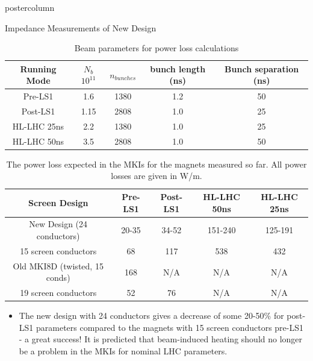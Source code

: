 \documentclass[final,hyperref={pdfpagelabels=false}]{beamer}
\begin{document}
\begin{frame}
\begin{columns}
\begin{column}{.49\textwidth}
\begin{beamercolorbox}[center,wd=\textwidth]{postercolumn}
\begin{minipage}[T]{.95\textwidth}
{\begin{block}{Impedance Measurements of New Design}
\begin{table}
\label{tab:beamPar}
\caption*{Beam parameters for power loss calculations}
\begin{center}
\begin{tabular}{c | c | c | c | c}
\small{Running Mode} & $N_{b}$ $10^{11}$ & $n_{bunches}$ & bunch length (ns) & Bunch separation (ns) \\ \hline 
\small{Pre-LS1} & 1.6 & 1380 & 1.2 & 50 \\ \hline
\small{Post-LS1} & 1.15 & 2808 & 1.0 & 25 \\ \hline
\small{HL-LHC 25ns}& 2.2 & 1380 & 1.0 & 25 \\ \hline
\small{HL-LHC 50ns}& 3.5 & 2808 & 1.0 & 50 \\
\end{tabular}
\end{center}
\end{table}

\begin{table}
\label{tab:heating-mki-screen-designs}
\caption*{\small{The power loss expected  in the MKIs for the magnets measured so far. All power losses are given in W/m.}}
\begin{center}
\begin{tabular}{c | c | c | c | c}
\small{Screen Design} & \small{Pre-LS1} & \small{Post-LS1} & \small{HL-LHC 50ns} & \small{HL-LHC 25ns} \\ \hline 
\small{New Design (24 conductors)} & 20-35 & 34-52 & 151-240 & 125-191 \\ \hline
\small{15 screen conductors} & 68 & 117 & 538 & 432 \\ \hline
\small{Old MKI8D (twisted, 15 conds)} & 168 & N/A & N/A & N/A \\ \hline
\small{19 screen conductors} & 52 & 76 & N/A & N/A \\
\end{tabular}
\end{center}
\end{table}
\begin{itemize}
\item{The new design with 24 conductors gives a decrease of some 20-50\% for post-LS1 parameters compared to the magnets with 15 screen conductors pre-LS1 - a great success! It is predicted that beam-induced heating should no longer be a problem in the MKIs for nominal LHC parameters.}
\end{itemize}


\end{block}}
\end{minipage}
\end{beamercolorbox}
\end{column}
\end{columns}
\end{frame}
\end{document}
